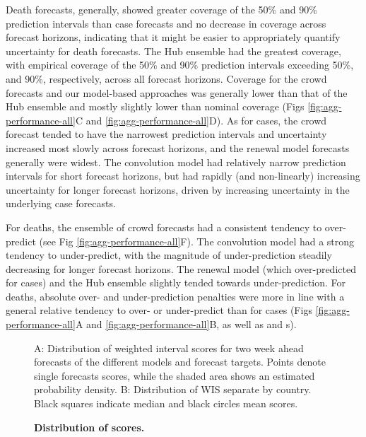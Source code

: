 \documentclass[10pt,letterpaper]{article}
\begin{document}
Death forecasts, generally, showed greater coverage of the 50\% and 90\%
prediction intervals than case forecasts and no decrease in coverage
across forecast horizons, indicating that it might be easier to
appropriately quantify uncertainty for death forecasts. The Hub ensemble
had the greatest coverage, with empirical coverage of the 50\% and 90\%
prediction intervals exceeding 50\%, and 90\%, respectively, across all
forecast horizons. Coverage for the crowd forecasts and our model-based
approaches was generally lower than that of the Hub ensemble and mostly
slightly lower than nominal coverage (Figs
\ref{fig:agg-performance-all}C and \ref{fig:agg-performance-all}D). As
for cases, the crowd forecast tended to have the narrowest prediction
intervals and uncertainty increased most slowly across forecast
horizons, and the renewal model forecasts generally were widest. The
convolution model had relatively narrow prediction intervals for short
forecast horizons, but had rapidly (and non-linearly) increasing
uncertainty for longer forecast horizons, driven by increasing
uncertainty in the underlying case forecasts.

For deaths, the ensemble of crowd forecasts had a consistent tendency to
over-predict (see Fig \ref{fig:agg-performance-all}F). The convolution
model had a strong tendency to under-predict, with the magnitude of
under-prediction steadily decreasing for longer forecast horizons. The
renewal model (which over-predicted for cases) and the Hub ensemble
slightly tended towards under-prediction. For deaths, absolute over- and
under-prediction penalties were more in line with a general relative
tendency to over- or under-predict than for cases (Figs
\ref{fig:agg-performance-all}A and \ref{fig:agg-performance-all}B, as
well as  and s).

\begin{figure}[H]
\caption{\bf{Distribution of scores. }}
A: Distribution of weighted interval scores for two week ahead forecasts of the different models and forecast targets. Points denote single forecasts scores, while the shaded area shows an estimated probability density. B: Distribution of WIS separate by country. Black squares indicate median and black circles mean scores.
\label{fig:distribution-scores}
\end{figure}
\end{document}
